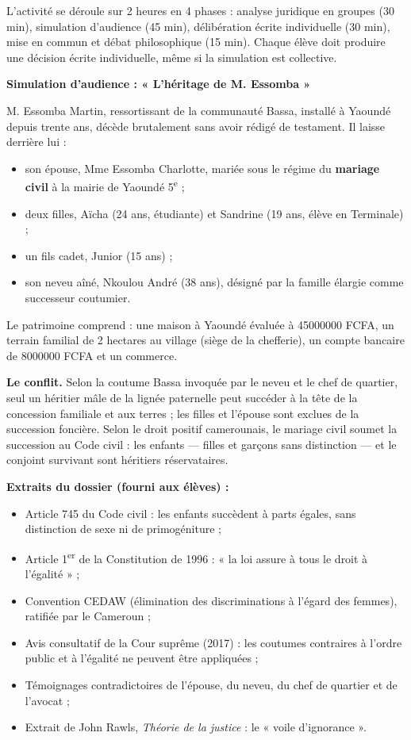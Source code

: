 \documentclass[11pt]{article}
\newcounter{popsec}
\newcounter{popsub}
\newcommand{\courssub}[1]{%
  \stepcounter{popsub}%
  \par\vspace{9pt}\noindent{\popxbold\fontsize{11.5}{13}\selectfont\color{popink}{\color{poporange}\thepopsec.\thepopsub}\hspace{6pt}#1}\par\nopagebreak\vspace{4pt}
}
\begin{document}
\begin{attention}
L'activité se déroule sur 2 heures en 4 phases : analyse juridique en groupes (30 min), simulation d'audience (45 min), délibération écrite individuelle (30 min), mise en commun et débat philosophique (15 min). Chaque élève doit produire une décision écrite individuelle, même si la simulation est collective.
\end{attention}

\courssub{Situation}

\textbf{Simulation d'audience : « L'héritage de M. Essomba »}

M. Essomba Martin, ressortissant de la communauté Bassa, installé à Yaoundé depuis trente ans, décède brutalement sans avoir rédigé de testament. Il laisse derrière lui :

\begin{itemize}
\item son épouse, Mme Essomba Charlotte, mariée sous le régime du \textbf{mariage civil} à la mairie de Yaoundé 5\textsuperscript{e} ;
\item deux filles, Aïcha (24 ans, étudiante) et Sandrine (19 ans, élève en Terminale) ;
\item un fils cadet, Junior (15 ans) ;
\item son neveu aîné, Nkoulou André (38 ans), désigné par la famille élargie comme successeur coutumier.
\end{itemize}

Le patrimoine comprend : une maison à Yaoundé évaluée à \num{45000000} FCFA, un terrain familial de 2 hectares au village (siège de la chefferie), un compte bancaire de \num{8000000} FCFA et un commerce.

\textbf{Le conflit.} Selon la coutume Bassa invoquée par le neveu et le chef de quartier, seul un héritier mâle de la lignée paternelle peut succéder à la tête de la concession familiale et aux terres ; les filles et l'épouse sont exclues de la succession foncière. Selon le droit positif camerounais, le mariage civil soumet la succession au Code civil : les enfants — filles et garçons sans distinction — et le conjoint survivant sont héritiers réservataires.

\textbf{Extraits du dossier (fourni aux élèves) :}
\begin{itemize}
\item Article 745 du Code civil : les enfants succèdent à parts égales, sans distinction de sexe ni de primogéniture ;
\item Article 1\textsuperscript{er} de la Constitution de 1996 : « la loi assure à tous le droit à l'égalité » ;
\item Convention CEDAW (élimination des discriminations à l'égard des femmes), ratifiée par le Cameroun ;
\item Avis consultatif de la Cour suprême (2017) : les coutumes contraires à l'ordre public et à l'égalité ne peuvent être appliquées ;
\item Témoignages contradictoires de l'épouse, du neveu, du chef de quartier et de l'avocat ;
\item Extrait de John Rawls, \emph{Théorie de la justice} : le « voile d'ignorance ».
\end{itemize}
\end{document}
